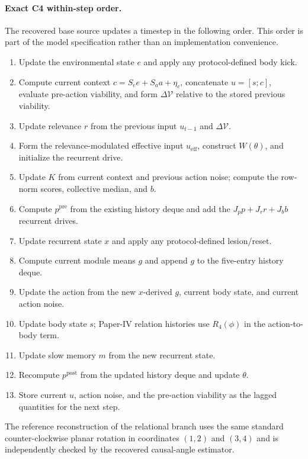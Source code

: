 \documentclass[11pt]{article}
\newcommand{\Vcal}{\mathcal{V}}
\begin{document}
\paragraph{Exact C4 within-step order.}
The recovered base source updates a timestep in the following order. This order is part of the model specification rather than an implementation convenience.
\begin{enumerate}[leftmargin=1.6em,itemsep=1pt,topsep=2pt]
\item Update the environmental state $e$ and apply any protocol-defined body kick.
\item Compute current context $c=S_ee+S_aa+\eta_c$, concatenate $u=[s;c]$, evaluate pre-action viability, and form $\Delta\Vcal$ relative to the stored previous viability.
\item Update relevance $r$ from the previous input $u_{t-1}$ and $\Delta\Vcal$.
\item Form the relevance-modulated effective input $u_{\mathrm{eff}}$, construct $W(\theta)$, and initialize the recurrent drive.
\item Update $K$ from current context and previous action noise; compute the row-norm scores, collective median, and $b$.
\item Compute $p^{\mathrm{pre}}$ from the existing history deque and add the $J_p p+J_r r+J_b b$ recurrent drives.
\item Update recurrent state $x$ and apply any protocol-defined lesion/reset.
\item Compute current module means $g$ and append $g$ to the five-entry history deque.
\item Update the action from the new $x$-derived $g$, current body state, and current action noise.
\item Update body state $s$; Paper-IV relation histories use $R_4(\phi)$ in the action-to-body term.
\item Update slow memory $m$ from the new recurrent state.
\item Recompute $p^{\mathrm{post}}$ from the updated history deque and update $\theta$.
\item Store current $u$, action noise, and the pre-action viability as the lagged quantities for the next step.
\end{enumerate}
The reference reconstruction of the relational branch uses the same standard counter-clockwise planar rotation in coordinates $(1,2)$ and $(3,4)$ and is independently checked by the recovered causal-angle estimator.
\end{document}
